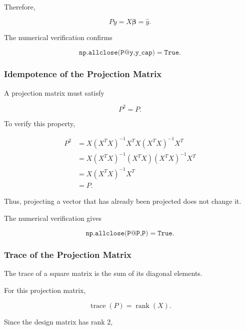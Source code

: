 \documentclass[12pt,a4paper]{article}
\numberwithin{equation}{section}
\begin{document}
Therefore,

\begin{equation}
\boxed{Py=X\boldsymbol{\beta}=\hat{y}}.
\end{equation}

The numerical verification confirms

\begin{equation}
\texttt{np.allclose(P@y,y\_cap)}
=\texttt{True}.
\end{equation}

\subsubsection{Idempotence of the Projection Matrix}

A projection matrix must satisfy

\begin{equation}
\boxed{P^2=P}.
\end{equation}

To verify this property,

\begin{equation}
\begin{aligned}
P^2
&=X(X^TX)^{-1}X^T
X(X^TX)^{-1}X^T\\
&=X(X^TX)^{-1}
(X^TX)
(X^TX)^{-1}X^T\\
&=X(X^TX)^{-1}X^T\\
&=P.
\end{aligned}
\end{equation}

Thus, projecting a vector that has already
been projected does not change it.

The numerical verification gives

\begin{equation}
\texttt{np.allclose(P@P,P)}
=\texttt{True}.
\end{equation}

\subsubsection{Trace of the Projection Matrix}

The trace of a square matrix is the sum of
its diagonal elements.

For this projection matrix,

\begin{equation}
\operatorname{trace}(P)=\operatorname{rank}(X).
\end{equation}

Since the design matrix has rank $2$,
\end{document}
